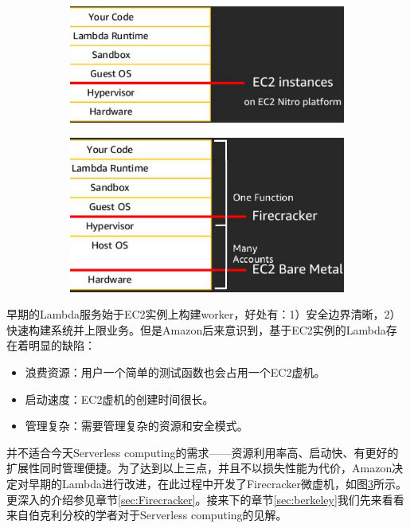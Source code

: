 \documentclass[11pt]{article}
\begin{document}
\begin{figure}[!htbp]
	\begin{subfigure}[b]{0.49\linewidth}
		\includegraphics[width=\linewidth]{figs/stack}
		\caption{}
		\label{figs:stack}	
	\end{subfigure}
	\begin{subfigure}[b]{0.49\linewidth}
		\includegraphics[width=\linewidth]{figs/stack_2}
		\caption{}
		\label{figs:stack_2}
	\end{subfigure}
	\caption{}
\end{figure}
早期的Lambda服务始于EC2实例上构建worker，好处有：1）安全边界清晰，2）快速构建系统并上限业务。但是Amazon后来意识到，基于EC2实例的Lambda存在着明显的缺陷：
\begin{itemize}
	\item 浪费资源：用户一个简单的测试函数也会占用一个EC2虚机。
	\item 启动速度：EC2虚机的创建时间很长。
	\item 管理复杂：需要管理复杂的资源和安全模式。
\end{itemize}
并不适合今天Serverless computing的需求——资源利用率高、启动快、有更好的扩展性同时管理便捷。为了达到以上三点，并且不以损失性能为代价，Amazon决定对早期的Lambda进行改进，在此过程中开发了Firecracker微虚机，如图\ref{figs:stack_2}所示。更深入的介绍参见章节\ref{sec:Firecracker}。接来下的章节\ref{sec:berkeley}我们先来看看来自伯克利分校的学者对于Serverless computing的见解。
\end{document}
